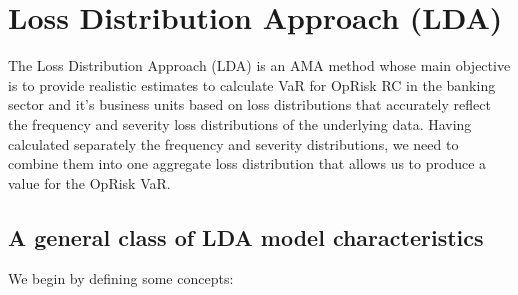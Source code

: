 \documentclass{DissertateUSU}
\begin{document}
\section{Loss Distribution Approach (LDA)}
\label{sec:Loss Distribution Approach (LDA)}

The Loss Distribution Approach (LDA) is an AMA method whose main
objective is to provide realistic estimates to calculate VaR for OpRisk
RC in the banking sector and it's business units based on loss
distributions that accurately reflect the frequency and severity loss
distributions of the underlying data. Having calculated separately the
frequency and severity distributions, we need to combine them into one
aggregate loss distribution that allows us to produce a value for the
OpRisk VaR. \medskip

\subsection{A general class of LDA model characteristics}

We begin by defining some concepts:
\end{document}
